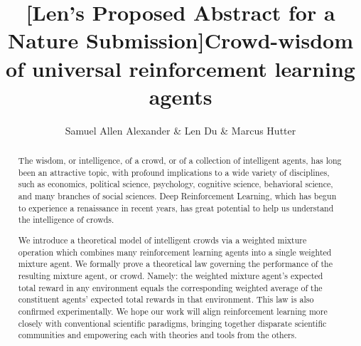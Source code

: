 \documentclass{article}
\begin{document}
\title{[Len's Proposed Abstract for a Nature Submission]Crowd-wisdom of universal reinforcement learning agents}
\author{Samuel Allen Alexander \& Len Du \& Marcus Hutter}


\maketitle

\begin{abstract}
The wisdom, or intelligence, of a crowd, or of a collection of intelligent agents, has long been an attractive topic, with profound implications to a wide variety of disciplines, such as economics, political science, psychology, cognitive science, behavioral science, and many branches of social sciences.
Deep Reinforcement Learning, which has begun to experience a renaissance in recent years,
has great potential to help us understand the intelligence of crowds.

We introduce a theoretical model of intelligent crowds via
a weighted mixture operation which combines many reinforcement learning agents
into a single weighted mixture agent.
We formally prove a theoretical law governing the performance of the resulting
mixture agent, or crowd.
Namely: the weighted mixture agent's expected total reward
in any environment equals the corresponding weighted average
of the constituent agents' expected total rewards in that environment.
This law is also confirmed experimentally.
We hope our work will align reinforcement learning more closely
with conventional scientific paradigms, bringing together disparate
scientific communities and empowering each with theories and tools from
the others.
\end{abstract}

%
%
\end{document}
